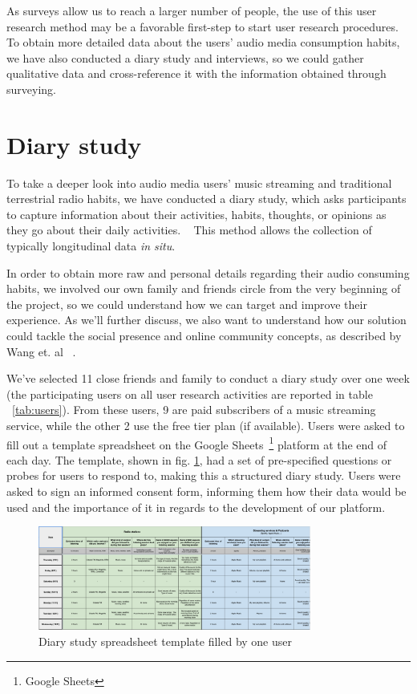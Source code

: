 As surveys allow us to reach a larger number of people, the use of this user research method may be a favorable first-step to start user research procedures. To obtain more detailed data about the users' audio media consumption habits, we have also conducted a diary study and interviews, so we could gather qualitative data and cross-reference it with the information obtained through surveying.

\section{Diary study}

To take a deeper look into audio media users' music streaming and traditional terrestrial radio habits, we have conducted a diary study, which asks participants to capture information about their activities, habits, thoughts, or opinions as they go about their daily activities. ~\cite{Courage2005} This method allows the collection of typically longitudinal data \textit{in situ}. 

In order to obtain more raw and personal details regarding their audio consuming habits, we involved our own family and friends circle from the very beginning of the project, so we could understand how we can target and improve their experience. As we'll further discuss, we also want to understand how our solution could tackle the social presence and online community concepts, as described by Wang et. al ~\cite{Wang2014}.

We've selected 11 close friends and family to conduct a diary study over one week (the participating users on all user research activities are reported in table ~\ref{tab:users}). From these users, 9 are paid subscribers of a music streaming service, while the other 2 use the free tier plan (if available). Users were asked to fill out a template spreadsheet on the Google Sheets~\footnote{Google Sheets} platform at the end of each day. The template, shown in fig. \ref{fig:diarystudy}, had a set of pre-specified questions or probes for users to respond to, making this a structured diary study. Users were asked to sign an informed consent form, informing them how their data would be used and the importance of it in regards to the development of our platform.


\begin{figure}[h]
\centering
\includegraphics[width=0.8\textwidth]{./Images/diarystudy.png}
\caption{Diary study spreadsheet template filled by one user}
\label{fig:diarystudy}
\end{figure}


